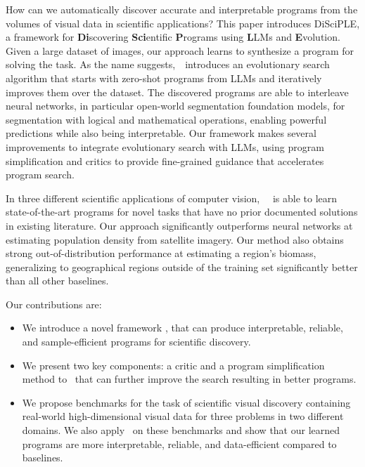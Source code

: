 How can we automatically discover accurate and interpretable programs from the volumes of visual data in scientific applications? This paper introduces DiSciPLE, a framework for \textbf{Di}scovering \textbf{Sci}entific \textbf{P}rograms  using \textbf{L}LMs
and \textbf{E}volution. Given a large dataset of images, our approach learns to synthesize a program for solving the task. As the name suggests,~\disciple~introduces an evolutionary search algorithm that starts with zero-shot programs from LLMs and iteratively improves them over the dataset. The discovered programs are able to interleave neural networks, in particular open-world segmentation foundation models, for segmentation with logical and mathematical operations, enabling powerful predictions while also being interpretable. Our framework makes several improvements to integrate evolutionary search with LLMs, using program simplification and critics to provide fine-grained guidance that accelerates program search.

In three different scientific applications of computer vision, ~\disciple~is able to learn state-of-the-art programs for novel tasks that have no prior documented solutions in existing literature. Our approach significantly outperforms neural networks at estimating population density from satellite imagery. Our method also obtains strong out-of-distribution performance at estimating a region’s biomass,  generalizing to geographical regions outside of the training set significantly better than all other baselines. 

Our contributions are:
\begin{itemize}
    \item We introduce a novel framework \textbf{\disciple}, that can produce interpretable, reliable, and sample-efficient programs for scientific discovery.
    \item We present two key components: a critic and a program simplification method to \disciple~that can further improve the search resulting in better programs.
    \item We propose benchmarks for the task of scientific visual discovery containing real-world high-dimensional visual data for three problems in two different domains. We also apply \disciple~on these benchmarks and show that our learned programs are more interpretable, reliable, and data-efficient compared to baselines.    
\end{itemize}





















